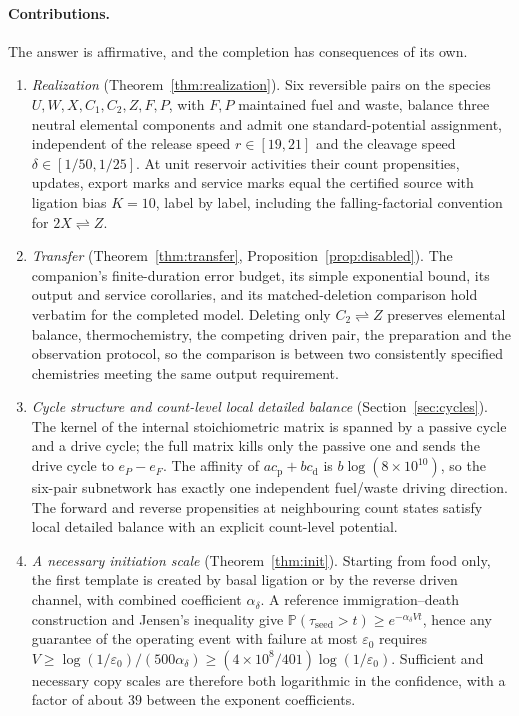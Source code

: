 \documentclass[11pt,a4paper]{article}
\theoremstyle{plain}
\theoremstyle{definition}
\theoremstyle{remark}
\newcommand{\Prob}{\mathbb P}
\newcommand{\eps}{\varepsilon}
\newcommand{\cP}{c_{\mathrm p}}
\newcommand{\cD}{c_{\mathrm d}}
\newcommand{\tseed}{\tau_{\mathrm{seed}}}
\begin{document}
\paragraph{Contributions.}
The answer is affirmative, and the completion has consequences of its own.
\begin{enumerate}[label=(\roman*)]
\item \emph{Realization} (Theorem~\ref{thm:realization}). Six reversible pairs on the species $U,W,X,C_1,C_2,Z,F,P$, with $F,P$ maintained fuel and waste, balance three neutral elemental components and admit one standard-potential assignment, independent of the release speed $r\in[19,21]$ and the cleavage speed $\delta\in[1/50,1/25]$. At unit reservoir activities their count propensities, updates, export marks and service marks equal the certified source with ligation bias $K=10$, label by label, including the falling-factorial convention for $2X\rightleftharpoons Z$.
\item \emph{Transfer} (Theorem~\ref{thm:transfer}, Proposition~\ref{prop:disabled}). The companion's finite-duration error budget, its simple exponential bound, its output and service corollaries, and its matched-deletion comparison hold verbatim for the completed model. Deleting only $C_2\rightleftharpoons Z$ preserves elemental balance, thermochemistry, the competing driven pair, the preparation and the observation protocol, so the comparison is between two consistently specified chemistries meeting the same output requirement.
\item \emph{Cycle structure and count-level local detailed balance} (Section~\ref{sec:cycles}). The kernel of the internal stoichiometric matrix is spanned by a passive cycle and a drive cycle; the full matrix kills only the passive one and sends the drive cycle to $e_P-e_F$. The affinity of $a\cP+b\cD$ is $b\log(8\times10^{10})$, so the six-pair subnetwork has exactly one independent fuel/waste driving direction. The forward and reverse propensities at neighbouring count states satisfy local detailed balance with an explicit count-level potential.
\item \emph{A necessary initiation scale} (Theorem~\ref{thm:init}). Starting from food only, the first template is created by basal ligation or by the reverse driven channel, with combined coefficient $\alpha_\delta$. A reference immigration--death construction and Jensen's inequality give $\Prob(\tseed>t)\ge e^{-\alpha_\delta Vt}$, hence any guarantee of the operating event with failure at most $\eps_0$ requires $V\ge\log(1/\eps_0)/(500\alpha_\delta)\ge(4\times10^8/401)\log(1/\eps_0)$. Sufficient and necessary copy scales are therefore both logarithmic in the confidence, with a factor of about $39$ between the exponent coefficients.

\end{enumerate}
\end{document}
